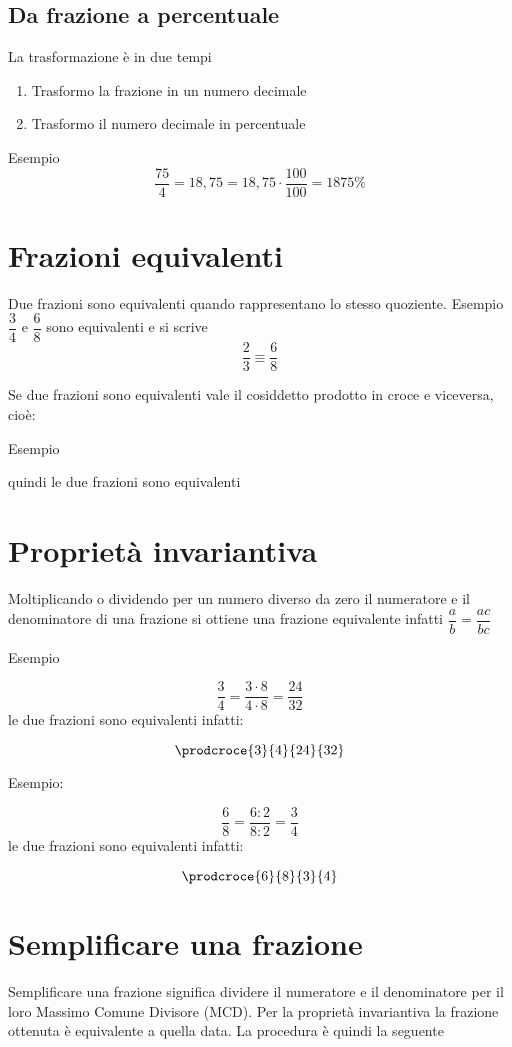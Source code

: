 \subsection{Da frazione a percentuale}
La trasformazione è in due tempi 
\begin{enumerate}
	\item Trasformo la frazione in un numero decimale
	\item Trasformo il numero decimale in percentuale
\end{enumerate}
Esempio 
\[\dfrac{75}{4}=18,75=18,75\cdot\dfrac{100}{100}=1875\% \]

\section{Frazioni equivalenti}
\label{sec:FrazioniEquivalentiNumRazzASS}
Due frazioni sono equivalenti quando rappresentano lo stesso quoziente. Esempio  $\dfrac{3}{4}$ e $\dfrac{6}{8}$ sono equivalenti e  si scrive \[\dfrac{2}{3} \equiv\dfrac{6}{8}\]

Se due frazioni sono equivalenti vale il cosiddetto prodotto in croce e viceversa, cioè:
\begin{center}
\end{center}
Esempio 
%
\begin{center}
\end{center}
quindi le due frazioni sono equivalenti
\section{Proprietà  invariantiva}
\label{sec:propInvariantivaNumASS}

Moltiplicando o dividendo per un numero diverso da zero il numeratore e il denominatore di una frazione si ottiene una frazione equivalente 
infatti $\dfrac{a}{b}=\dfrac{ac}{bc}$
\begin{center}
\end{center}

Esempio

\[\dfrac{3}{4}=\dfrac{3\cdot 8}{4\cdot 8}=\dfrac{24}{32}\]   le due frazioni sono equivalenti infatti: 

\[\prodcroce{3}{4}{24}{32}\]

Esempio:

\[\dfrac{6}{8}=\dfrac{6:2}{8:2}=\dfrac{3}{4}\]   le due frazioni sono equivalenti infatti: 

\[\prodcroce{6}{8}{3}{4}\]
\section{Semplificare una frazione}
\label{sec:sempunaFrazASS}
Semplificare una frazione significa dividere il numeratore e il denominatore per il loro Massimo Comune Divisore (MCD). Per la proprietà invariantiva la frazione ottenuta è equivalente a quella data.
La procedura è quindi la seguente 

